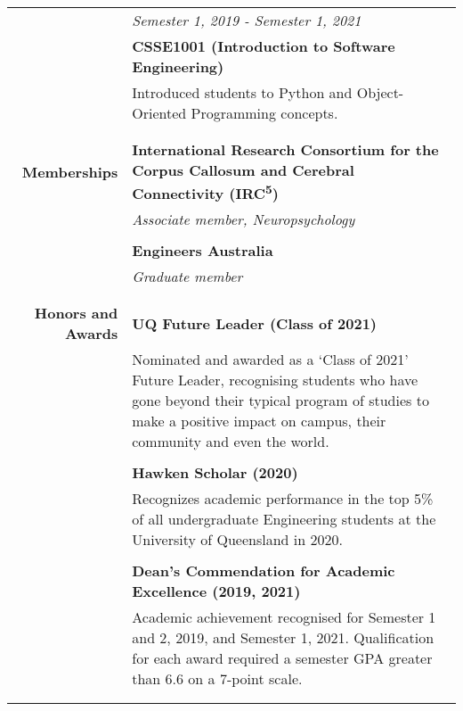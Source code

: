 \documentclass{article}
\begin{document}
\begin{longtable}{>{\columncolor{LeftColumn}}r | p{13cm}}
											& \textit{Semester 1, 2019 - Semester 1, 2021 } \\
											& \textbf{CSSE1001 (Introduction to Software Engineering)} \\
											& Introduced students to Python and Object-Oriented Programming concepts. \\
											& \\
											\hline

											\pagebreak

											\hline \\

		\large\textbf{Memberships} 	  		& \large\textbf{International Research Consortium for the Corpus Callosum and Cerebral Connectivity (IRC\textsuperscript{5})} \\
											& \textit{Associate member, Neuropsychology} \\ 
											& \\

											& \large\textbf{Engineers Australia} \\
											& \textit{Graduate member} \\
											& \\
											\hline \\

		\large\textbf{Honors and Awards}	& \large\textbf{UQ Future Leader (Class of 2021)} \\
											& Nominated and awarded as a `Class of 2021' Future Leader, recognising students who have gone beyond their typical program of studies to make a positive impact on campus, their community and even the world.  \\
											& \\

											& \large\textbf{Hawken Scholar (2020)} \\
											& Recognizes academic performance in the top 5\% of all undergraduate Engineering students at the University of Queensland in 2020. \\
											& \\
											
											& \large\textbf{Dean's Commendation for Academic Excellence (2019, 2021)} \\
											& Academic achievement recognised for Semester 1 and 2, 2019, and Semester 1, 2021. Qualification for each award required a semester GPA greater than 6.6 on a 7-point scale. \\
											& \\
											\hline \\


\end{longtable}
\end{document}
